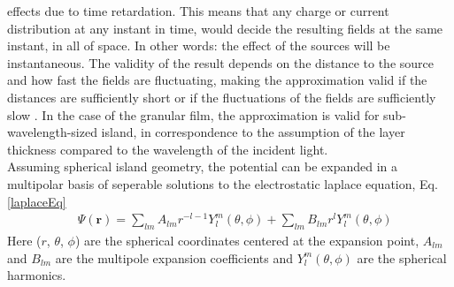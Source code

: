 effects due to time retardation. This means that any charge or current distribution at any instant in time, 
would decide the resulting fields at the same instant, in all of space. In other words: the effect of 
the sources will be instantaneous. 
The validity of the result depends on the distance to the source
and how fast the fields are fluctuating, making the approximation valid if the distances are
sufficiently short or if the fluctuations of the fields are sufficiently slow
\cite[p.308-309]{Griffiths}.
%
In the case of the granular film, the approximation is valid for sub-wavelength-sized island,
in correspondence to the assumption of the layer thickness compared to the wavelength of the incident
light.\\
Assuming spherical island geometry, the potential can be expanded in a multipolar basis of
seperable solutions to the electrostatic laplace equation, Eq.\eqref{laplaceEq} \cite[p.~78]{BedeauxVliegerBook}
\begin{align}
   \label{multipoleSolution}
   &\Psi(\boldsymbol{r}) = \sum\limits_{lm} A_{lm} r^{-l-1} Y_l^m(\theta,\phi)
   + \sum\limits_{lm} B_{lm} r^{l} Y_l^m(\theta,\phi)
\end{align}
Here ($r$, $\theta$, $\phi$) are the spherical coordinates centered at the expansion point, 
$A_{lm}$ and $B_{lm}$ are the multipole expansion coefficients and $Y_l^m(\theta,\phi)$ are the
spherical harmonics.
%

